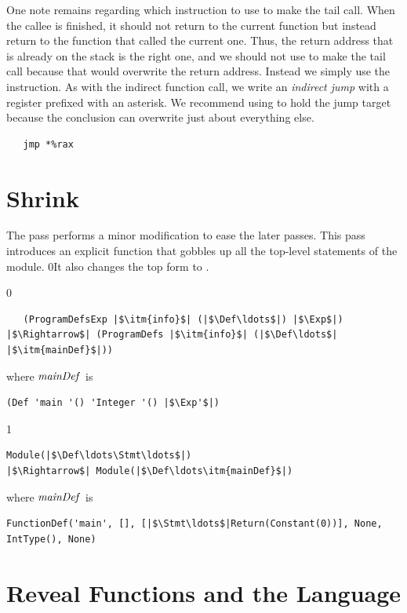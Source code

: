 \documentclass[7x10]{TimesAPriori_MIT}%
\def\racketEd{0}
\def\pythonEd{1}
\def\edition{1}
\newcommand{\racket}[1]{{\if\edition\racketEd{#1}\fi}}
\newcommand{\pythonColor}[0]{}
\numberwithin{theorem}{chapter}
\numberwithin{definition}{chapter}
\numberwithin{equation}{chapter}
\begin{document}
One note remains regarding which instruction to use to make the tail
call. When the callee is finished, it should not return to the current
function but instead return to the function that called the current
one. Thus, the return address that is already on the stack is the
right one, and we should not use  to make the tail call
because that would overwrite the return address. Instead we simply use
the  instruction. As with the indirect function call, we write
an \emph{indirect jump} with a register
prefixed with an asterisk.  We recommend using  to hold the
jump target because the conclusion can overwrite just about everything
else.
\begin{lstlisting}
   jmp *%rax
\end{lstlisting}


\section{Shrink \LangFun{}}
\label{sec:shrink-r4}

The  pass performs a minor modification to ease the
later passes. This pass introduces an explicit  function
that gobbles up all the top-level statements of the module.
%
\racket{It also changes the top  form to
\code{ProgramDefs}.}

{\if\edition\racketEd  
\begin{lstlisting}
   (ProgramDefsExp |$\itm{info}$| (|$\Def\ldots$|) |$\Exp$|)
|$\Rightarrow$| (ProgramDefs |$\itm{info}$| (|$\Def\ldots$| |$\itm{mainDef}$|))
\end{lstlisting}
where $\mathit{mainDef}$ is
\begin{lstlisting}
(Def 'main '() 'Integer '() |$\Exp'$|)
\end{lstlisting}
\fi}
{\if\edition\pythonEd\pythonColor
\begin{lstlisting}
Module(|$\Def\ldots\Stmt\ldots$|)
|$\Rightarrow$| Module(|$\Def\ldots\itm{mainDef}$|)
\end{lstlisting}
where $\mathit{mainDef}$ is
\begin{lstlisting}
FunctionDef('main', [], [|$\Stmt\ldots$|Return(Constant(0))], None, IntType(), None)
\end{lstlisting}
\fi}

\section{Reveal Functions and the \LangFunRef{} Language}
\label{sec:reveal-functions-r4}
\end{document}
